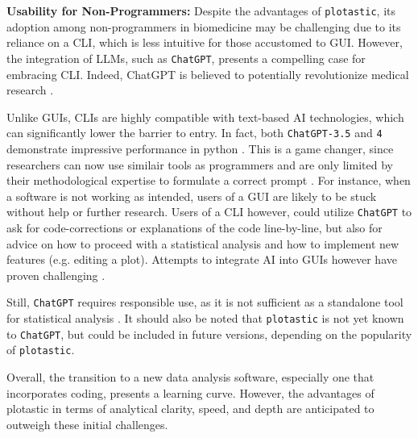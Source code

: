 \textbf{Usability for Non-Programmers:}
Despite the advantages of \texttt{plotastic}, its adoption among non-programmers
in biomedicine may be challenging due to its reliance on a \ac{CLI}, which is
less intuitive for those accustomed to \ac{GUI}. However, the integration of
\acp{LLM}, such as \texttt{ChatGPT}, presents a compelling case for embracing CLI.
Indeed, ChatGPT is believed to potentially revolutionize medical research
\cite{ruksakulpiwatUsingChatGPTMedical2023}.

Unlike GUIs, CLIs are highly compatible with text-based AI technologies, which
can significantly lower the barrier to entry. In fact, both \texttt{ChatGPT-3.5}
and \texttt{4} demonstrate impressive performance in python
\cite{arefinUnmaskingGiantComprehensive2024}. This is a game changer, since
researchers can now use similair tools as programmers and are only limited by
their methodological expertise to formulate a correct prompt
\cite{qureshiAreChatGPTLarge2023}. For instance, when a software is not
working as intended, users of a GUI are likely to be stuck without help or
further research. Users of a CLI however, could utilize \texttt{ChatGPT} to ask for
code-corrections or explanations of the code line-by-line, but also for advice
on how to proceed with a statistical analysis and how to implement new features
(e.g. editing a plot). Attempts to integrate AI into GUIs however have proven
challenging \cite{gaoASSISTGUITaskOrientedDesktop2024}.

Still, \texttt{ChatGPT} requires responsible use, as it is not sufficient as a standalone
tool for statistical analysis \cite{ordakChatGPTSkillsStatistical2023}. It
should also be noted that \texttt{plotastic} is not yet known to \texttt{ChatGPT}, but
could be included in future versions, depending on the popularity of
\texttt{plotastic}.

Overall, the transition to a new data analysis software, especially one
that incorporates coding, presents a learning curve. However, the advantages of
plotastic in terms of analytical clarity, speed, and depth are anticipated to
outweigh these initial challenges.


